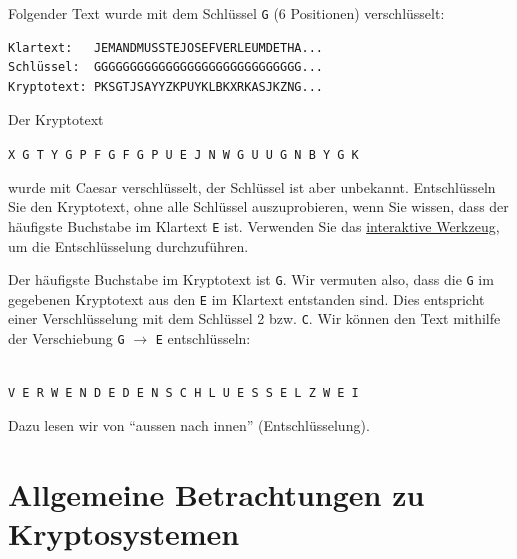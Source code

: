 \begin{myexample}
	Folgender Text wurde mit dem Schlüssel \texttt{G} (6 Positionen) verschlüsselt:

	\begin{verbatim}
Klartext:   JEMANDMUSSTEJOSEFVERLEUMDETHA...
Schlüssel:  GGGGGGGGGGGGGGGGGGGGGGGGGGGGG...
Kryptotext: PKSGTJSAYYZKPUYKLBKXRKASJKZNG...
\end{verbatim}
\end{myexample}

\begin{myexercise}\label{myexercise:vorbetrachung_haeufigkeitsanalyse}
	Der Kryptotext
	\begin{center}
		\texttt{X G T Y G P F G F G P U E J N W G U U G N B Y G K}
	\end{center}
	wurde mit Caesar verschlüsselt, der Schlüssel ist aber unbekannt.
	Entschlüsseln Sie den Kryptotext, ohne alle Schlüssel auszuprobieren, wenn Sie wissen, dass der häufigste Buchstabe im Klartext \texttt{E} ist. Verwenden Sie das \href{https://www.101computing.net/cipher-wheel.html}{interaktive Werkzeug}, um die Entschlüsselung durchzuführen.
	\begin{myanswer}
		Der häufigste Buchstabe im Kryptotext ist \texttt{G}. Wir vermuten also, dass die \texttt{G} im gegebenen Kryptotext aus den \texttt{E} im Klartext entstanden sind. Dies entspricht einer Verschlüsselung mit dem Schlüssel 2 bzw. \texttt{C}. Wir können den Text mithilfe der Verschiebung \texttt{G} $\rightarrow$ \texttt{E} entschlüsseln:
		\begin{center}
			\caesar[2]\\
			\texttt{V E R W E N D E D E N S C H L U E S S E L Z W E I}
		\end{center}
		Dazu lesen wir von \enquote{aussen nach innen} (Entschlüsselung).
	\end{myanswer}
\end{myexercise}


\section{Allgemeine Betrachtungen zu Kryptosystemen}
